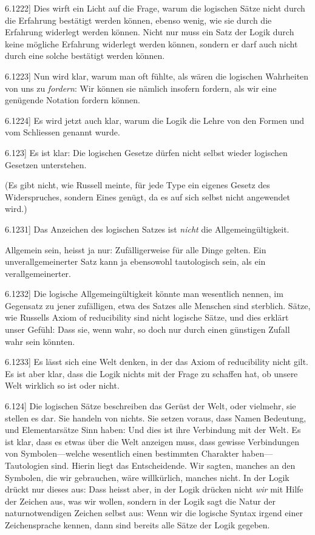 \documentclass[12pt,oneside]{book}[2007/10/19]
\newcommand{\PropERef}[1]{\hyperref[PropE:#1]{#1}}
\newcommand{\PropositionG}[2]{%
  \item[\phantomsection\label{PropG:#1}\PropERef{#1}] #2%
}
\newcommand{\Emph}[1]{\emph{#1}}%
\begin{document}
\begin{propositions}
\PropositionG{6.1222}
{Dies wirft ein Licht auf die Frage, warum die
logischen Sätze nicht durch die Erfahrung bestätigt
werden können, ebenso wenig, wie sie durch die
Erfahrung widerlegt werden können. Nicht nur
muss ein Satz der Logik durch keine mögliche Erfahrung
widerlegt werden können, sondern er darf auch
nicht durch eine solche bestätigt werden können.}


\PropositionG{6.1223}
{Nun wird klar, warum man oft fühlte, als wären
die \glqq{}logischen Wahrheiten\grqq{} von uns zu \glqq{}\Emph{fordern}\grqq{}:
Wir können sie nämlich insofern fordern, als wir
eine genügende Notation fordern können.}


\PropositionG{6.1224}
{Es wird jetzt auch klar, warum die Logik die
Lehre von den Formen und vom Schliessen genannt
wurde.}


\PropositionG{6.123}
{Es ist klar: Die logischen Gesetze dürfen nicht
selbst wieder logischen Gesetzen unterstehen.

(Es gibt nicht, wie Russell meinte, für jede
\glqq{}Type\grqq{} ein eigenes Gesetz des Widerspruches,
sondern Eines genügt, da es auf sich selbst nicht
angewendet wird.)}


\PropositionG{6.1231}
{Das Anzeichen des logischen Satzes ist \Emph{nicht}
die Allgemeingültigkeit.

Allgemein sein, heisst ja nur: Zufälligerweise
für alle Dinge gelten. Ein unverallgemeinerter
Satz kann ja ebensowohl tautologisch sein, als ein
verallgemeinerter.}


\PropositionG{6.1232}
{Die logische Allgemeingültigkeit könnte man
wesentlich nennen, im Gegensatz zu jener zufälligen,
etwa des Satzes \glqq{}alle Menschen sind sterblich\grqq{}.
Sätze, wie Russells \glqq{}Axiom of reducibility\grqq{} sind
nicht logische Sätze, und dies erklärt unser Gefühl:
Dass sie, wenn wahr, so doch nur durch einen
günstigen Zufall wahr sein könnten.}


\PropositionG{6.1233}
{Es lässt sich eine Welt denken, in der das
Axiom of reducibility nicht gilt. Es ist aber klar,
dass die Logik nichts mit der Frage zu schaffen
hat, ob unsere Welt wirklich so ist oder nicht.}


\PropositionG{6.124}
{Die logischen Sätze beschreiben das Gerüst der
Welt, oder vielmehr, sie stellen es dar. Sie
\glqq{}handeln\grqq{} von nichts. Sie setzen voraus, dass
Namen Bedeutung, und Elementarsätze Sinn
haben: Und dies ist ihre Verbindung mit der
Welt. Es ist klar, dass es etwas über die Welt
anzeigen muss, dass gewisse Verbindungen von
Symbolen---welche wesentlich einen bestimmten
Charakter haben---Tautologien sind. Hierin liegt
das Entscheidende. Wir sagten, manches an
den Symbolen, die wir gebrauchen, wäre willkürlich,
manches nicht. In der Logik drückt nur
dieses aus: Dass heisst aber, in der Logik drücken
nicht \Emph{wir} mit Hilfe der Zeichen aus, was wir
wollen, sondern in der Logik sagt die Natur der
naturnotwendigen Zeichen selbst aus: Wenn wir die
logische Syntax irgend einer Zeichensprache kennen,
dann sind bereits alle Sätze der Logik gegeben.}



\end{propositions}
\end{document}

